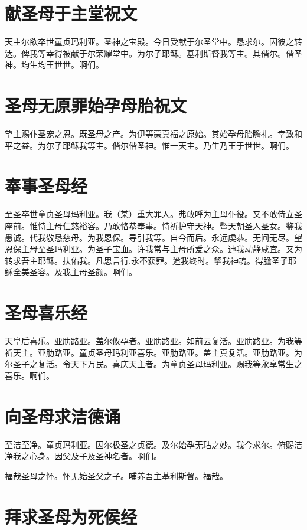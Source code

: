 \documentclass[UTF8,17pt]{ctexart}
\begin{document}
\section{献圣母于主堂祝⽂}

天主尔欲卒世童贞玛利亚。圣神之宝殿。今⽇受献于尔圣堂中。恳求尔。因彼之转达。俾我等幸得被献于尔荣耀堂中。为尔⼦耶稣。基利斯督我等主。其偕尔。偕圣神。均⽣均王世世。啊们。

\section{圣母⽆原罪始孕母胎祝⽂}

望主赐仆圣宠之恩。既圣母之产。为伊等蒙真福之原始。其始孕母胎瞻礼。幸致和平之益。为尔⼦耶稣我等主。偕尔偕圣神。惟⼀天主。乃⽣乃王于世世。啊们。

\section{奉事圣母经}

⾄圣卒世童贞圣母玛利亚。我（某）重⼤罪⼈。弗敢呼为主母仆役。又不敢侍⽴圣座前。惟恃主母仁慈裕容。乃敢恪恭奉事。恃祈护守天神。暨天朝圣⼈圣⼥。鉴我愚诚。代我敬恳慈母。为我恩保。导引我等。⾃今⽽后。永远虔恭。⽆间⽆尽。望恩保主母⾄圣玛利亚。为圣⼦宝⾎。许我常与主母所爱之众。迪我动静咸宜。又为转求吾主耶稣。扶佑我。凡思⾔⾏.永不获罪。迨我终时。挈我神魂。得膽圣⼦耶稣全美圣容。及我主母圣颜。啊们。

\section{圣母喜乐经}

天皇后喜乐。亚肋路亚。盖尔攸孕者。亚肋路亚。如前云复活。亚肋路亚。为我等祈天主。亚肋路亚。童贞圣母玛利亚喜乐。亚肋路亚。盖主真复活。亚肋路亚。为尔圣⼦之复活。令天下万民。喜庆天主者。为童贞圣母玛利亚。赐我等永享常⽣之喜乐。啊们。

\section{向圣母求洁德诵}

⾄洁⾄净。童贞玛利亚。因尔极圣之贞德。及尔始孕⽆玷之妙。我今求尔。俯赐洁净我之⼼⾝。因⽗及⼦及圣神名者。啊们。

福哉圣母之怀。怀⽆始圣⽗之⼦。哺养吾主基利斯督。福哉。

\section{拜求圣母为死侯经}
\end{document}
